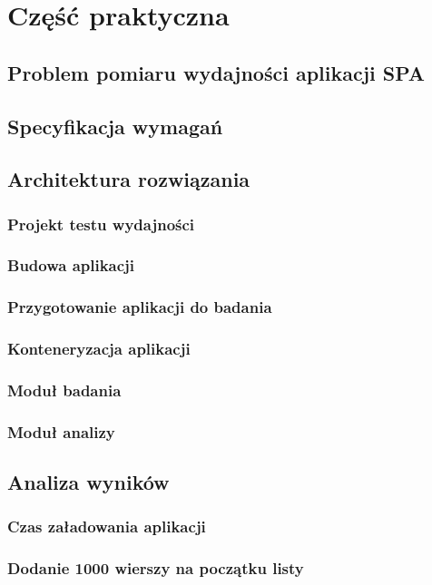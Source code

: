 \chapter{Część praktyczna}

\section{Problem pomiaru wydajności aplikacji SPA}

\section{Specyfikacja wymagań}

\section{Architektura rozwiązania}
\subsection{Projekt testu wydajności}
\subsection{Budowa aplikacji}
\subsection{Przygotowanie aplikacji do badania}
\subsection{Konteneryzacja aplikacji}
\subsection{Moduł badania}
\subsection{Moduł analizy}

\section{Analiza wyników}
\subsection{Czas załadowania aplikacji}
\subsection{Dodanie 1000 wierszy na początku listy}
